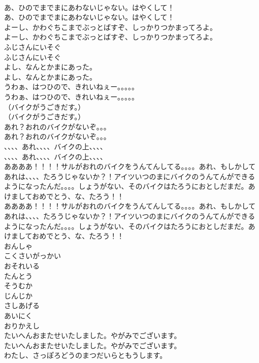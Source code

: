 \documentclass[8pt]{extreport}
\begin{document}
\begin{CJK}{UTF8}{min}
\\	あ、ひのでまでまにあわないじゃない。はやくして！	
\\	あ、ひのでまでまにあわないじゃない。はやくして！ 
\\	よーし、かわぐちこまでぶっとばすぞ、しっかりつかまってろよ。	
\\	よーし、かわぐちこまでぶっとばすぞ、しっかりつかまってろよ。 
\\	ふじさんにいそぐ	
\\	ふじさんにいそぐ 
\\	よし、なんとかまにあった。	
\\	よし、なんとかまにあった。 
\\	うわぁ、はつひので、きれいねぇー。。。。。	
\\	うわぁ、はつひので、きれいねぇー。。。。。 
\\	（バイクがうごきだす。）
\\	（バイクがうごきだす。）
\\	あれ？おれのバイクがないぞ。。。	
\\	あれ？おれのバイクがないぞ。。。 
\\	、、、、あれ、、、、バイクの上、、、、	
\\	、、、、あれ、、、、バイクの上、、、、 
\\	ああああ！！！！サルがおれのバイクをうんてんしてる。。。。あれ、もしかしてあれは、、、、たろうじゃないか？！アイツいつのまにバイクのうんてんができるようになったんだ。。。。しょうがない、そのバイクはたろうにおとしだまだ。あけましておめでとう、な、たろう！！	
\\	ああああ！！！！サルがおれのバイクをうんてんしてる。。。。あれ、もしかしてあれは、、、、たろうじゃないか？！アイツいつのまにバイクのうんてんができるようになったんだ。。。。しょうがない、そのバイクはたろうにおとしだまだ。あけましておめでとう、な、たろう！！ 
\\	おんしゃ
\\	こくさいがっかい
\\	おそれいる
\\	たんとう
\\	そうむか
\\	じんじか
\\	さしあげる
\\	あいにく
\\	おりかえし
\\	たいへんおまたせいたしました。やがみでございます。	
\\	たいへんおまたせいたしました。やがみでございます。 
\\	わたし、さっぽろどうのまつだいらともうします。	

\end{CJK}
\end{document}
